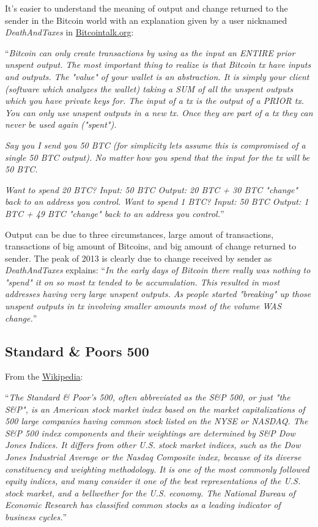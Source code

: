 It's easier to understand the meaning of output and change returned to
the sender in the Bitcoin world with an explanation given by a user
nicknamed \textit{DeathAndTaxes} in
\href{https://bitcointalk.org/index.php?topic=99593.0}{Bitcointalk.org}:

``\textit{Bitcoin can only create transactions by using as the input
  an ENTIRE prior unspent output. The most important thing to realize
  is that Bitcoin tx have inputs and outputs. The "value" of your
  wallet is an abstraction. It is simply your client (software which
  analyzes the wallet) taking a SUM of all the unspent outputs which
  you have private keys for. The input of a tx is the output of a
  PRIOR tx. You can only use unspent outputs in a new tx. Once they
  are part of a tx they can never be used again ("spent").}

\textit{Say you I send you 50 BTC (for simplicity lets assume this is
  compromised of a single 50 BTC output). No matter how you spend that
  the input for the tx will be 50 BTC.}

\textit{Want to spend 20 BTC? Input: 50 BTC Output: 20 BTC + 30 BTC
  "change" back to an address you control. Want to spend 1 BTC? Input:
  50 BTC Output: 1 BTC + 49 BTC "change" back to an address you
  control.}''

Output can be due to three circumstances, large amout of transactions,
transactions of big amount of Bitcoins, and big amount of change
returned to sender. The peak of 2013 is clearly due to change received
by sender as \textit{DeathAndTaxes} explains: ``\textit{In the early
  days of Bitcoin there really was nothing to "spend" it on so most tx
  tended to be accumulation. This resulted in most addresses having
  very large unspent outputs. As people started "breaking" up those
  unspent outputs in tx involving smaller amounts most of the volume
  WAS change.}''


\subsection{Standard \& Poors 500}
\label{sec:standard-and-poors-500}


From the
\href{https://en.wikipedia.org/wiki/S\%26P_500_Index}{Wikipedia}:

``\textit{The Standard \& Poor's 500, often abbreviated as the S\&P
  500, or just "the S\&P", is an American stock market index based on
  the market capitalizations of 500 large companies having common
  stock listed on the NYSE or NASDAQ. The S\&P 500 index components
  and their weightings are determined by S\&P Dow Jones Indices. It
  differs from other U.S. stock market indices, such as the Dow Jones
  Industrial Average or the Nasdaq Composite index, because of its
  diverse constituency and weighting methodology. It is one of the
  most commonly followed equity indices, and many consider it one of
  the best representations of the U.S. stock market, and a bellwether
  for the U.S. economy. The National Bureau of Economic Research has
  classified common stocks as a leading indicator of business
  cycles.}''

